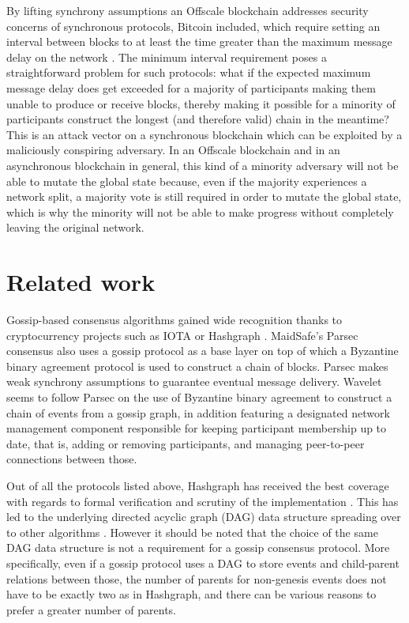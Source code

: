 \documentclass[a4paper,11pt]{article}
\begin{document}
By lifting synchrony assumptions an Offscale blockchain addresses security concerns of synchronous
protocols, Bitcoin included, which require setting an interval between blocks to at least the time
greater than the maximum message delay on the network \cite{rethinking}. The minimum interval
requirement poses a straightforward problem for such protocols: what if the expected maximum message
delay does get exceeded for a majority of participants making them unable to produce or receive
blocks, thereby making it possible for a minority of participants construct the longest (and
therefore valid) chain in the meantime? This is an attack vector on a synchronous blockchain which
can be exploited by a maliciously conspiring adversary. In an Offscale blockchain and in an
asynchronous blockchain in general, this kind of a minority adversary will not be able to mutate the
global state because, even if the majority experiences a network split, a majority vote is still
required in order to mutate the global state, which is why the minority will not be able to make
progress without completely leaving the original network.


\section{Related work}

Gossip-based consensus algorithms gained wide recognition thanks to cryptocurrency projects such as
IOTA or Hashgraph \cite{hashgraph}. MaidSafe's Parsec \cite{parsec} consensus also uses a gossip
protocol as a base layer on top of which a Byzantine binary agreement protocol is used to construct
a chain of blocks. Parsec makes weak synchrony assumptions to guarantee eventual message
delivery. Wavelet \cite{wavelet} seems to follow Parsec on the use of Byzantine binary agreement to
construct a chain of events from a gossip graph, in addition featuring a designated network
management component responsible for keeping participant membership up to date, that is, adding or
removing participants, and managing peer-to-peer connections between those.

Out of all the protocols listed above, Hashgraph has received the best coverage with regards to
formal verification \cite{hashgraph-coq} and scrutiny of the implementation
\cite{hashgraph-fud}. This has led to the underlying directed acyclic graph (DAG) data structure
spreading over to other algorithms \cite{parsec, lachesis}. However it should be noted that the
choice of the same DAG data structure is not a requirement for a gossip consensus protocol. More
specifically, even if a gossip protocol uses a DAG to store events and child-parent relations
between those, the number of parents for non-genesis events does not have to be exactly two as in
Hashgraph, and there can be various reasons to prefer a greater number of parents.
\end{document}

